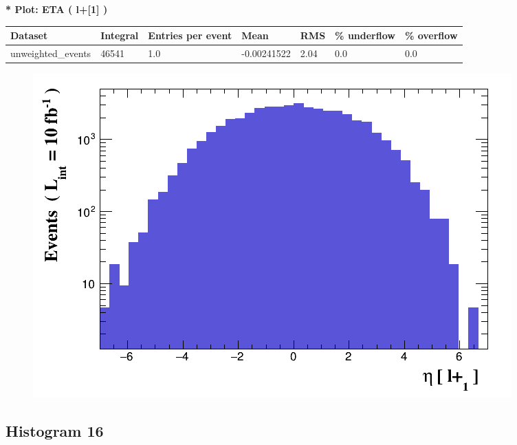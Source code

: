 \documentclass[a4paper, 10pt]{article}
\begin{document}
\textbf{* Plot: ETA ( l+[1] ) }\\
   \begin{table}[H]
  \begin{center}
    \begin{tabular}{|m{23.0mm}|m{23.0mm}|m{18.0mm}|m{19.0mm}|m{19.0mm}|m{19.0mm}|m{19.0mm}|}
      \hline
      {\cellcolor{yellow}         Dataset}& {\cellcolor{yellow}         Integral}& {\cellcolor{yellow}         Entries per event}& {\cellcolor{yellow}         Mean}& {\cellcolor{yellow}         RMS}& {\cellcolor{yellow}         \% underflow}& {\cellcolor{yellow}         \% overflow}\\
      \hline
      {\cellcolor{white}         unweighted\_events}& {\cellcolor{white}         46541}& {\cellcolor{white}         1.0}& {\cellcolor{white}         -0.00241522}& {\cellcolor{white}         2.04}& {\cellcolor{green}         0.0}& {\cellcolor{green}         0.0}\\
\hline
    \end{tabular}
  \end{center}
\end{table}

\begin{figure}[H]
  \begin{center}
    \includegraphics[scale=0.45]{selection_14.png}\\
\caption{   }
  \end{center}
\end{figure}
      \newpage
\subsection{ Histogram 16}
\end{document}
